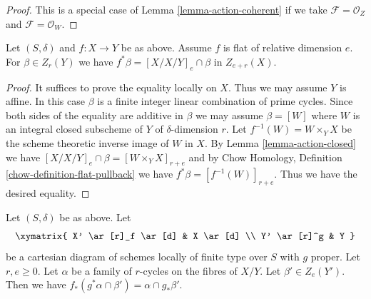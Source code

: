 \begin{proof}
This is a special case of Lemma \ref{lemma-action-coherent}
if we take $\mathcal{F} = \mathcal{O}_Z$ and $\mathcal{F} = \mathcal{O}_W$.
\end{proof}

\begin{lemma}
\label{lemma-flat-pullback-as-action}
Let $(S, \delta)$ and $f : X \to Y$ be as above. Assume
$f$ is flat of relative dimension $e$. For $\beta \in Z_r(Y)$
we have $f^*\beta = [X/X/Y]_e \cap \beta$ in $Z_{e + r}(X)$.
\end{lemma}

\begin{proof}
It suffices to prove the equality locally on $X$. Thus we may assume
$Y$ is affine. In this case $\beta$ is a finite integer linear combination
of prime cycles. Since both sides of the equality are additive in $\beta$
we may assume $\beta = [W]$ where $W$ is an integral closed subscheme of
$Y$ of $\delta$-dimension $r$. Let $f^{-1}(W) = W \times_Y X$ be the
scheme theoretic inverse image of $W$ in $X$. By
Lemma \ref{lemma-action-closed} we have
$[X/X/Y]_e \cap \beta = [W \times_Y X]_{r + e}$ and by
Chow Homology, Definition \ref{chow-definition-flat-pullback}
we have $f^*\beta = [f^{-1}(W)]_{r + e}$. Thus we have the desired
equality.
\end{proof}

\begin{lemma}
\label{lemma-action-push-pull}
Let $(S, \delta)$ be as above. Let
$$
\xymatrix{
X' \ar[r]_f \ar[d] & X \ar[d] \\
Y' \ar[r]^g & Y
}
$$
be a cartesian diagram of schemes locally of finite type over $S$
with $g$ proper. Let $r, e \geq 0$. Let $\alpha$ be a family of
$r$-cycles on the fibres of $X/Y$. Let $\beta' \in Z_e(Y')$.
Then we have $f_*(g^*\alpha \cap \beta') = \alpha \cap g_*\beta'$.
\end{lemma}

